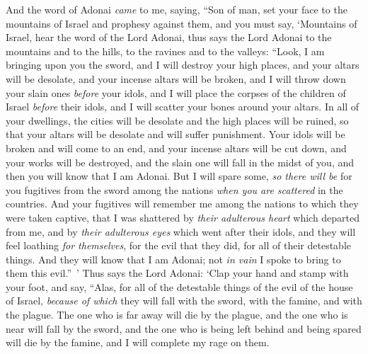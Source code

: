 \begin{biblechapter} %
 And the word of Adonai \textit{came} to me, saying,
\verse “Son of man, set your face to the mountains of Israel and prophesy against them,
\verse and you must say, ‘Mountains of Israel, hear the word of the Lord Adonai, thus says the Lord Adonai to the mountains and to the hills, to the ravines and to the valleys: “Look, I am bringing upon you the sword, and I will destroy your high places,
\verse and your altars will be desolate, and your incense altars will be broken, and I will throw down your slain ones \textit{before} your idols,
\verse and I will place the corpses of the children of Israel \textit{before} their idols, and I will scatter your bones around your altars.
\verse In all of your dwellings, the cities will be desolate and the high places will be ruined, so that your altars will be desolate and will suffer punishment. Your idols will be broken and will come to an end, and your incense altars will be cut down, and your works will be destroyed,
\verse and the slain one will fall in the midst of you, and then you will know that I am Adonai.
\verse But I will spare some, \textit{so there will be} for you fugitives from the sword among the nations \textit{when you are scattered} in the countries.
\verse And your fugitives will remember me among the nations to which they were taken captive, that I was shattered by \textit{their adulterous heart} which departed from me, and by \textit{their adulterous eyes} which went after their idols, and they will feel loathing \textit{for themselves}, for the evil that they did, for all of their detestable things.
\verse And they will know that I am Adonai; not \textit{in vain} I spoke to bring to them this evil.” ’
\verse Thus says the Lord Adonai: ‘Clap your hand and stamp with your foot, and say, “Alas, for all of the detestable things of the evil of the house of Israel, \textit{because of which} they will fall with the sword, with the famine, and with the plague.
\verse The one who is far away will die by the plague, and the one who is near will fall by the sword, and the one who is being left behind and being spared will die by the famine, and I will complete my rage on them.

\end{biblechapter}
